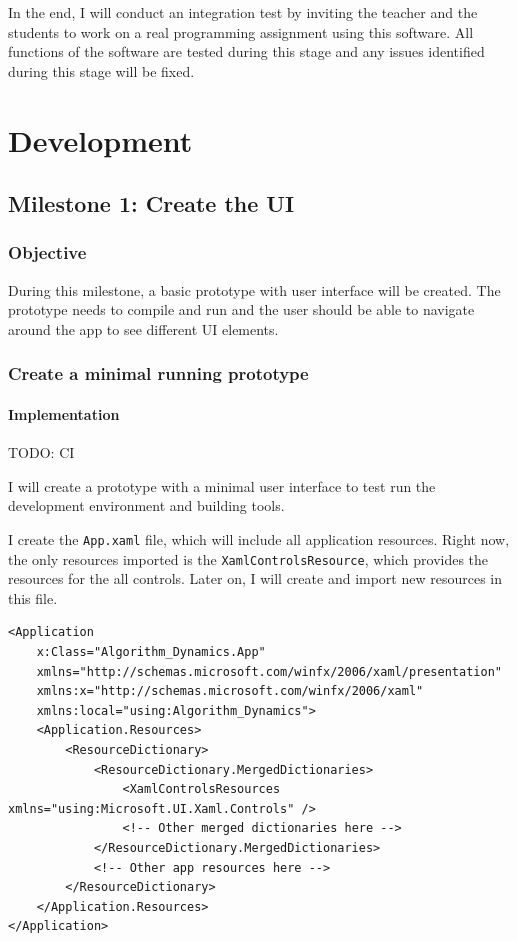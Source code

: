 \documentclass[a4paper]{report}
\newcommand{\code}{\texttt}
\begin{document}
In the end, I will conduct an integration test by inviting the teacher and the students to work on a real programming assignment using this software. All functions of the software are tested during this stage and any issues identified during this stage will be fixed.

\chapter{Development}

\section{Milestone 1: Create the UI}

\subsection{Objective}

During this milestone, a basic prototype with user interface will be created. The prototype needs to compile and run and the user should be able to navigate around the app to see different UI elements.

\subsection{Create a minimal running prototype}

\subsubsection{Implementation}

TODO: CI

I will create a prototype with a minimal user interface to test run the development environment and building tools.\cite{microsoft:docs:create-your-first-winui3-app}

I create the \code{App.xaml} file, which will include all application resources. Right now, the only resources imported is the \code{XamlControlsResource}, which provides the resources for the all controls. Later on, I will create and import new resources in this file.

\begin{verbatim}
<Application
    x:Class="Algorithm_Dynamics.App"
    xmlns="http://schemas.microsoft.com/winfx/2006/xaml/presentation"
    xmlns:x="http://schemas.microsoft.com/winfx/2006/xaml"
    xmlns:local="using:Algorithm_Dynamics">
    <Application.Resources>
        <ResourceDictionary>
            <ResourceDictionary.MergedDictionaries>
                <XamlControlsResources xmlns="using:Microsoft.UI.Xaml.Controls" />
                <!-- Other merged dictionaries here -->
            </ResourceDictionary.MergedDictionaries>
            <!-- Other app resources here -->
        </ResourceDictionary>
    </Application.Resources>
</Application>
\end{verbatim}
\end{document}
